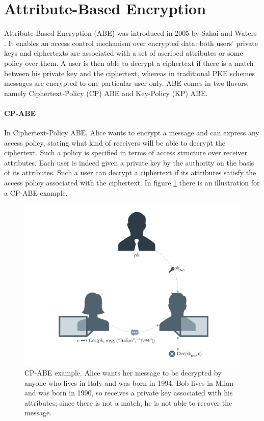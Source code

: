 \section{Attribute-Based Encryption}\label{sec:abe}

Attribute-Based Encryption (ABE) was introduced in 2005 by Sahai and Waters \cite{Sahai}.
It enables an access control mechanism over encrypted data: both users’ private keys and ciphertexts are associated with a set of ascribed attributes or some policy over them.
A user is then able to decrypt a ciphertext if there is a match between his private key and the ciphertext, whereas in traditional PKE schemes messages are encrypted to one particular user only.
\newline\newline
ABE comes in two flavors, namely Ciphertext-Policy (CP) ABE and Key-Policy (KP) ABE.

\paragraph*{CP-ABE}
In Ciphertext-Policy ABE, Alice wants to encrypt a message and can express any access policy, stating what kind of receivers will be able to decrypt the ciphertext.
Such a policy is specified in terms of access structure over receiver attributes.
Each user is indeed given a private key by the authority on the basis of its attributes.
Such a user can decrypt a ciphertext if its attributes satisfy the access policy associated with the ciphertext.
In figure \ref{fig:cp_abe_example} there is an illustration for a CP-ABE example.
\begin{figure}[ht]
    \centering
    \includegraphics[width=\linewidth]{images/cp_abe.png}
    \caption{CP-ABE example. Alice wants her message to be decrypted by anyone who lives in Italy and was born in 1994. Bob lives in Milan and was born in 1990, so receives a private key associated with his attributes; since there is not a match, he is not able to recover the message.}
    \label{fig:cp_abe_example}
\end{figure}

